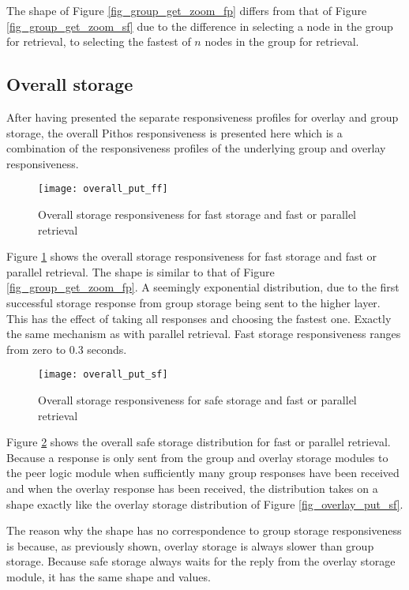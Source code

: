 The shape of Figure \ref{fig_group_get_zoom_fp} differs from that of Figure \ref{fig_group_get_zoom_sf} due to the difference in selecting a node in the group for retrieval, to selecting the fastest of $n$ nodes in the group for retrieval.

\subsection{Overall storage}

After having presented the separate responsiveness profiles for overlay and group storage, the overall Pithos responsiveness is presented here which is a combination of the responsiveness profiles of the underlying group and overlay responsiveness.

\begin{figure}[htbp]
 \centering
 \texttt{[image: overall\_put\_ff]}
 \caption{Overall storage responsiveness for fast storage and fast or parallel retrieval}
 \label{fig_overall_put_ff}
\end{figure}
%
Figure \ref{fig_overall_put_ff} shows the overall storage responsiveness for fast storage and fast or parallel retrieval. The shape is similar to that of Figure \ref{fig_group_get_zoom_fp}. A seemingly exponential distribution, due to the first successful storage response from group storage being sent to the higher layer. This has the effect of taking all responses and choosing the fastest one. Exactly the same mechanism as with parallel retrieval. Fast storage responsiveness ranges from zero to 0.3 seconds.

\begin{figure}[htbp]
 \centering
 \texttt{[image: overall\_put\_sf]}
 \caption{Overall storage responsiveness for safe storage and fast or parallel retrieval}
 \label{fig_overall_put_sf}
\end{figure}
%
Figure \ref{fig_overall_put_sf} shows the overall safe storage distribution for fast or parallel retrieval. Because a response is only sent from the group and overlay storage modules to the peer logic module when sufficiently many group responses have been received and when the overlay response has been received, the distribution takes on a shape exactly like the overlay storage distribution of Figure \ref{fig_overlay_put_sf}.

The reason why the shape has no correspondence to group storage responsiveness is because, as previously shown, overlay storage is always slower than group storage. Because safe storage always waits for the reply from the overlay storage module, it has the same shape and values.

